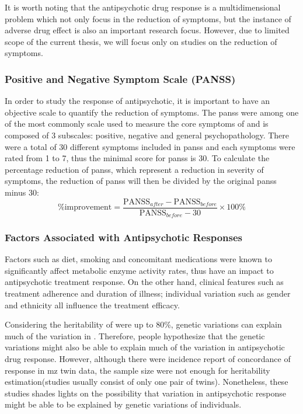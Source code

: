 	It is worth noting that the antipsychotic drug response is a multidimensional problem which not only focus in the reduction of symptoms, but the instance of adverse drug effect is also an important research focus. 
	However, due to limited scope of the current thesis, we will focus only on studies on the reduction of symptoms.
	
	\subsubsection{Positive and Negative Symptom Scale (PANSS)}		
	In order to study the response of antipsychotic, it is important to have an objective scale to quantify the reduction of symptoms.
	The \gls{panss}\citep{Kay1987} were among one of the most commonly scale used to measure the core symptoms of  and is composed of 3 subscales: positive, negative and general psychopathology.
	There were a total of 30 different symptoms included in \gls{panss} and each symptoms were rated from 1 to 7, thus the minimal score for \gls{panss} is 30.
	To calculate the percentage reduction of \gls{panss}, which represent a reduction in severity of symptoms, the reduction of \gls{panss} will then be divided by the original \gls{panss} minus 30:
	$$
		\%\text{improvement} = \frac{\text{PANSS}_{after}-\text{PANSS}_{before}}{\text{PANSS}_{before}-30}\times 100\%
	$$
	
	\subsubsection{Factors Associated with Antipsychotic Responses}
	Factors such as diet, smoking and concomitant medications were known to significantly affect metabolic enzyme activity rates, thus have an impact to antipsychotic treatment response\citep{Arranz2011}.
	On the other hand, clinical features such as treatment adherence and duration of illness; individual variation such as gender and ethnicity all influence the treatment efficacy\citep{Arranz2011}.
	 
	Considering the heritability of  were up to 80\%, genetic variations can explain much of the variation in . 
	Therefore, people hypothesize that the genetic variations might also be able to explain much of the variation in antipsychotic drug response.
	However, although there were incidence report of concordance of response in \gls{mz} twin data\citep{Vojvoda1996,Mata2001}, the sample size were not enough for heritability estimation(studies usually consist of only one pair of twins).
	Nonetheless, these studies shades lights on the possibility that variation in antipsychotic response might be able to be explained by genetic variations of individuals.
	


